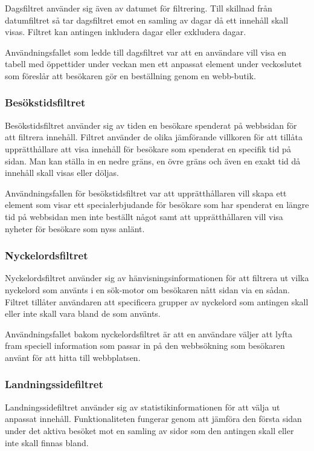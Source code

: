 Dagsfiltret använder sig även av datumet för filtrering. Till skillnad från datumfiltret så tar dagsfiltret emot en samling av dagar då ett innehåll skall visas. Filtret kan antingen inkludera dagar eller exkludera dagar.

Användningsfallet som ledde till dagsfiltret var att en användare vill visa en tabell med öppettider under veckan men ett anpassat element under veckoslutet som föreslår att besökaren gör en beställning genom en webb-butik.

\subsubsection{Besökstidsfiltret}

Besökstidsfiltret använder sig av tiden en besökare spenderat på webbsidan för att filtrera innehåll. Filtret använder de olika jämförande villkoren för att tillåta upprätthållare att visa innehåll för besökare som spenderat en specifik tid på sidan. Man kan ställa in en nedre gräns, en övre gräns och även en exakt tid då innehåll skall visas eller döljas.

Användningsfallen för besökstidsfiltret var att upprätthållaren vill skapa ett element som visar ett specialerbjudande för besökare som har spenderat en längre tid på webbsidan men inte beställt något samt att upprätthållaren vill visa nyheter för besökare som nyss anlänt.

\subsubsection{Nyckelordsfiltret}

Nyckelordsfiltret använder sig av hänvisningsinformationen för att filtrera ut vilka nyckelord som använts i en sök-motor om besökaren nått sidan via en sådan. Filtret tillåter användaren att specificera grupper av nyckelord som antingen skall eller inte skall vara bland de som använts.

Användningsfallet bakom nyckelordsfiltret är att en användare väljer att lyfta fram speciell information som passar in på den webbsökning som besökaren använt för att hitta till webbplatsen.

\subsubsection{Landningssidefiltret}

Landningssidefiltret använder sig av statistikinformationen för att välja ut anpassat innehåll. Funktionaliteten fungerar genom att jämföra den första sidan under det aktiva besöket mot en samling av sidor som den antingen skall eller inte skall finnas bland.

